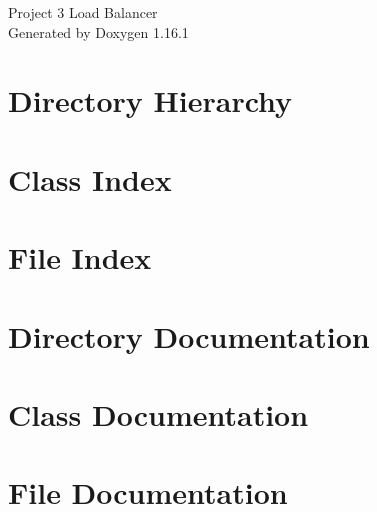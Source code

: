 \documentclass[twoside]{book}
\newcommand{\+}{\discretionary{\mbox{\scriptsize$\hookleftarrow$}}{}{}}
\newcommand{\clearemptydoublepage}{%
    \newpage{\pagestyle{empty}\cleardoublepage}%
  }
\begin{document}
  \raggedbottom
    \hypersetup{pageanchor=false,
                bookmarksnumbered=true,
                pdfencoding=unicode
               }
  \begin{titlepage}
  \vspace*{7cm}
  \begin{center}%
  {\Large Project 3 Load Balancer}\\
  \vspace*{1cm}
  {\large Generated by Doxygen 1.16.1}\\
  \end{center}
  \end{titlepage}
  \clearemptydoublepage
  \tableofcontents
  \clearemptydoublepage
  \hypersetup{pageanchor=true}

\chapter{Directory Hierarchy}

\chapter{Class Index}

\chapter{File Index}

\chapter{Directory Documentation}


\chapter{Class Documentation}







\chapter{File Documentation}

















  \backmatter
  \newpage
  \clearemptydoublepage
  \printindex
\end{document}
